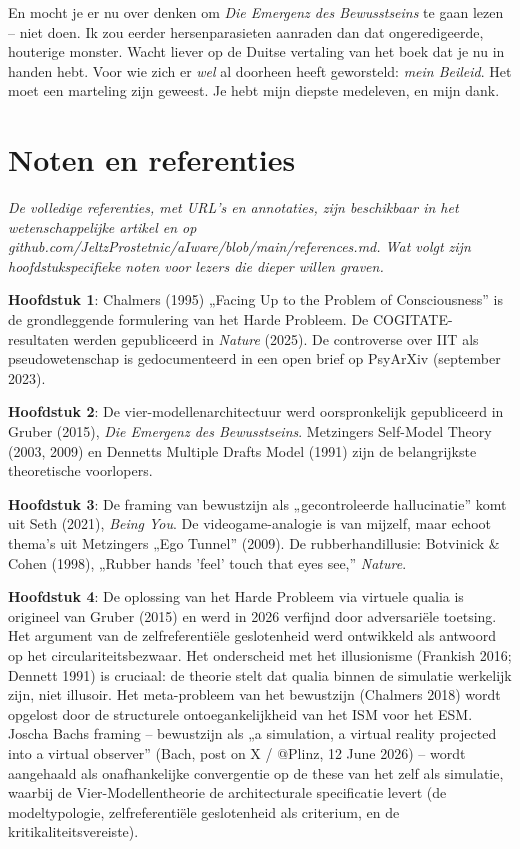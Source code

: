 \documentclass[11pt, twoside, openright]{book}
\begin{document}
En mocht je er nu over denken om \textit{Die Emergenz des Bewusstseins} te gaan lezen -- niet doen. Ik zou eerder hersenparasieten aanraden dan dat ongeredigeerde, houterige monster. Wacht liever op de Duitse vertaling van het boek dat je nu in handen hebt. Voor wie zich er \textit{wel} al doorheen heeft geworsteld: \textit{mein Beileid}. Het moet een marteling zijn geweest. Je hebt mijn diepste medeleven, en mijn dank.


\chapter*{Noten en referenties}

\textit{De volledige referenties, met URL's en annotaties, zijn beschikbaar in het wetenschappelijke artikel en op github.com/\allowbreak{}JeltzProstetnic/\allowbreak{}aIware/\allowbreak{}blob/\allowbreak{}main/\allowbreak{}references.md. Wat volgt zijn hoofdstukspecifieke noten voor lezers die dieper willen graven.}

\textbf{Hoofdstuk 1}: Chalmers (1995) „Facing Up to the Problem of Consciousness” is de grondleggende formulering van het Harde Probleem. De COGITATE-resultaten werden gepubliceerd in \textit{Nature} (2025). De controverse over IIT als pseudowetenschap is gedocumenteerd in een open brief op PsyArXiv (september 2023).

\textbf{Hoofdstuk 2}: De vier-modellenarchitectuur werd oorspronkelijk gepubliceerd in Gruber (2015), \textit{Die Emergenz des Bewusstseins}. Metzingers Self-Model Theory (2003, 2009) en Dennetts Multiple Drafts Model (1991) zijn de belangrijkste theoretische voorlopers.

\textbf{Hoofdstuk 3}: De framing van bewustzijn als „gecontroleerde hallucinatie” komt uit Seth (2021), \textit{Being You}. De videogame-analogie is van mijzelf, maar echoot thema's uit Metzingers „Ego Tunnel” (2009). De rubberhandillusie: Botvinick \& Cohen (1998), „Rubber hands 'feel' touch that eyes see,” \textit{Nature}.

\textbf{Hoofdstuk 4}: De oplossing van het Harde Probleem via virtuele qualia is origineel van Gruber (2015) en werd in 2026 verfijnd door adversariële toetsing. Het argument van de zelfreferentiële geslotenheid werd ontwikkeld als antwoord op het circulariteitsbezwaar. Het onderscheid met het illusionisme (Frankish 2016; Dennett 1991) is cruciaal: de theorie stelt dat qualia binnen de simulatie werkelijk zijn, niet illusoir. Het meta-probleem van het bewustzijn (Chalmers 2018) wordt opgelost door de structurele ontoegankelijkheid van het ISM voor het ESM. Joscha Bachs framing -- bewustzijn als „a simulation, a virtual reality projected into a virtual observer” (Bach, post on X / @Plinz, 12 June 2026) -- wordt aangehaald als onafhankelijke convergentie op de these van het zelf als simulatie, waarbij de Vier-Modellentheorie de architecturale specificatie levert (de modeltypologie, zelfreferentiële geslotenheid als criterium, en de kritikaliteitsvereiste).
\end{document}
